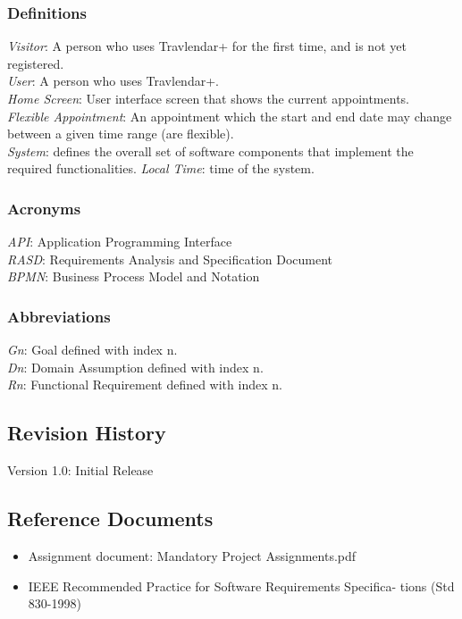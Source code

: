 \documentclass[12pt]{article}
\begin{document}
\subsubsection{Definitions}
\textit{Visitor}: A person who uses Travlendar+ for the first time, and is not yet registered.\\
\textit{User}: A person who uses Travlendar+.\\
\textit{Home Screen}: User interface screen that shows the current appointments.\\
\textit{Flexible Appointment}: An appointment which the start and end date may change between a given time range (are flexible).\\
\textit{System}: defines the overall set of software components that implement the required functionalities.
\textit{Local Time}: time of the system.
\subsubsection{Acronyms}
\textit{API}: Application Programming Interface\\
\textit{RASD}: Requirements Analysis and Specification Document\\
\textit{BPMN}: Business Process Model and Notation
\subsubsection{Abbreviations}
\textit{Gn}: Goal defined with index n.\\
\textit{Dn}: Domain Assumption defined with index n.\\
\textit{Rn}: Functional Requirement defined with index n.


\subsection{Revision History}
Version 1.0: Initial Release

\subsection{Reference Documents}
\begin{itemize}
    \item Assignment document: Mandatory Project Assignments.pdf
    \item IEEE Recommended Practice for Software Requirements Specifica- tions (Std 830-1998)
\end{itemize}
\end{document}
